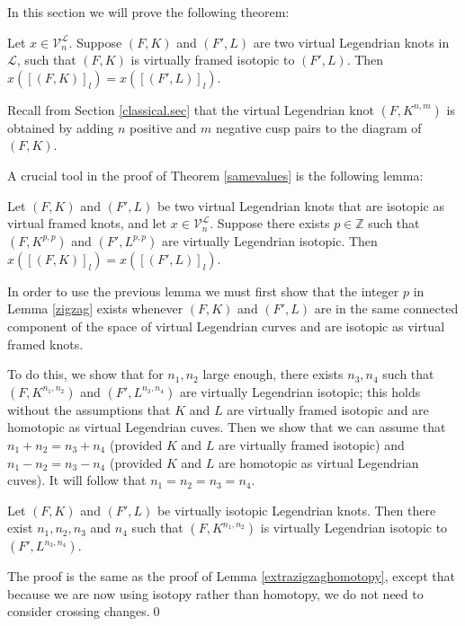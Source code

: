In this section we will prove the following theorem:

\begin{thm} \label{samevalues}
Let $x\in \mathcal{V}_n^\mathcal{L}$.  Suppose $(F, K)$ and $(F', L)$ are two virtual Legendrian knots in $ \mathcal{L}$, such that $(F, K)$ is virtually framed isotopic to $(F', L)$.   Then $x([(F, K)]_l) = x([(F', L)]_l)$.
\end{thm}
Recall from Section \ref{classical.sec} that the virtual Legendrian knot $(F, K^{n, m})$ is obtained by adding $n$ positive and $m$ negative cusp pairs to the diagram of $(F, K)$.  

A crucial tool in the proof of Theorem \ref{samevalues} is the following lemma:

\begin{lem}\label{zigzag} Let $(F,K)$ and $(F', L)$ be two virtual Legendrian knots that are isotopic as virtual framed knots, and let $x\in\mathcal{V}^\mathcal{L}_n$. Suppose there exists $p\in \mathbb{Z}$ such that $(F,K^{p,p})$ and $(F',L^{p,p})$ are virtually Legendrian isotopic.  Then $x([(F,K)]_l)=x([(F',L)]_l)$.
\end{lem}

In order to use the previous lemma we must first show that the integer $p$ in Lemma \ref{zigzag} exists whenever $(F,K)$ and $(F',L)$ are in the same connected component of the space of virtual Legendrian curves and are isotopic as virtual framed knots.

To do this, we show that for $n_1,n_2$ large enough, there exists $n_3,n_4$ such that $(F,K^{n_1,n_2})$ and $(F',L^{n_3,n_4})$ are virtually Legendrian isotopic; this holds without the assumptions that $K$ and $L$ are virtually framed isotopic and are homotopic as virtual Legendrian cuves.  Then we show that we can assume that $n_1+n_2=n_3+n_4$ (provided $K$ and $L$ are virtually framed isotopic) and $n_1-n_2=n_3-n_4$ (provided $K$ and $L$ are homotopic as virtual Legendrian cuves).  It will follow that $n_1=n_2=n_3=n_4$.


\begin{lem}\label{fuchstab}
Let $(F, K)$ and $(F', L)$ be virtually isotopic Legendrian knots.  Then there exist $n_1, n_2, n_3$ and $n_4$ such that $(F,K^{n_1,n_2})$ is virtually Legendrian isotopic to $(F', L^{n_3, n_4})$.
\end{lem}
\pp
The proof is the same as the proof of Lemma \ref{extrazigzaghomotopy}, except that because we are now using isotopy rather than homotopy, we do not need to consider crossing changes.\qed


